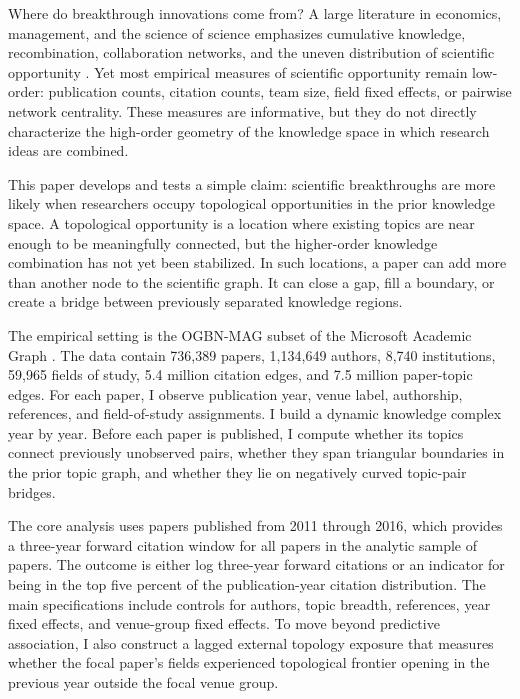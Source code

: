 \documentclass[preprint,12pt,authoryear]{elsarticle}
\begin{document}
Where do breakthrough innovations come from? A large literature in economics, management, and the science of science emphasizes cumulative knowledge, recombination, collaboration networks, and the uneven distribution of scientific opportunity \citep{uzzi2013atypical,fortuna2020science,acemoglu2016innovation}. Yet most empirical measures of scientific opportunity remain low-order: publication counts, citation counts, team size, field fixed effects, or pairwise network centrality. These measures are informative, but they do not directly characterize the high-order geometry of the knowledge space in which research ideas are combined.

This paper develops and tests a simple claim: scientific breakthroughs are more likely when researchers occupy topological opportunities in the prior knowledge space. A topological opportunity is a location where existing topics are near enough to be meaningfully connected, but the higher-order knowledge combination has not yet been stabilized. In such locations, a paper can add more than another node to the scientific graph. It can close a gap, fill a boundary, or create a bridge between previously separated knowledge regions.

The empirical setting is the OGBN-MAG subset of the Microsoft Academic Graph \citep{sinha2015overview,hu2020ogb}. The data contain 736,389 papers, 1,134,649 authors, 8,740 institutions, 59,965 fields of study, 5.4 million citation edges, and 7.5 million paper-topic edges. For each paper, I observe publication year, venue label, authorship, references, and field-of-study assignments. I build a dynamic knowledge complex year by year. Before each paper is published, I compute whether its topics connect previously unobserved pairs, whether they span triangular boundaries in the prior topic graph, and whether they lie on negatively curved topic-pair bridges.

The core analysis uses papers published from 2011 through 2016, which provides a three-year forward citation window for all papers in the analytic sample of \AnalyticN{} papers. The outcome is either log three-year forward citations or an indicator for being in the top five percent of the publication-year citation distribution. The main specifications include controls for authors, topic breadth, references, year fixed effects, and venue-group fixed effects. To move beyond predictive association, I also construct a lagged external topology exposure that measures whether the focal paper's fields experienced topological frontier opening in the previous year outside the focal venue group.
\end{document}
